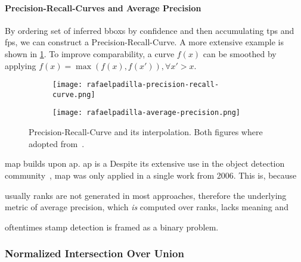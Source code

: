 \paragraph{Precision-Recall-Curves and Average Precision}\label{par:precision-recall-curves-ap}
By ordering set of inferred \glspl{bbox} by confidence and then accumulating
\glspl{tp} and \glspl{fp}, we can construct a Precision-Recall-Curve.
A more extensive example is shown in \cref{fig:precision-recall-curve}.
To improve comparability, a curve \(f(x)\) can be smoothed by applying
\(f(x) = \max (f(x), f(x')), \forall x' > x\). 

\begin{figure}[htp!]
    \begin{subfigure}[t]{.49\linewidth}
        \centering
        \texttt{[image: rafaelpadilla-precision-recall-curve.png]}
    \end{subfigure}
    \hfill
    \begin{subfigure}[t]{.49\linewidth}
        \centering
        \texttt{[image: rafaelpadilla-average-precision.png]}
    \end{subfigure}
    \caption[Precision-Recall-Curve]{Precision-Recall-Curve and its
    interpolation. Both figures where adopted from~\cite{Padilla.2019}.}\label{fig:precision-recall-curve}
\end{figure}

\Gls{map} builds upon \gls{ap}. \Gls{ap} is a 
Despite its extensive use in the object detection community~\cite{Liu.2016,Ren.2015}, 
\Gls{map} was only applied in a single work \cite{Zhu.2006} from 2006. This is,
because 
\begin{enumerate*}[i.)]
    \item usually ranks are not generated in most approaches, therefore the 
    underlying metric of average precision, which \textit{is} computed over ranks, 
    lacks meaning and
    \item oftentimes stamp detection is framed as a binary problem.
\end{enumerate*} 

\subsubsection{Normalized Intersection Over Union}\label{subsect:normalized-iou}
\blindtext[1]

